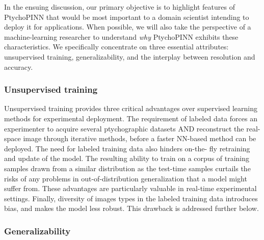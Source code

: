 \documentclass[sn-mathphys]{sn-jnl}%
\theoremstyle{thmstyleone}%
\theoremstyle{thmstyletwo}%
\theoremstyle{thmstylethree}%
\begin{document}
In the ensuing discussion, our primary objective is to highlight features of PtychoPINN  that would be most important to a domain scientist intending to deploy it for applications. When possible, we will also take the perspective of a machine-learning researcher to understand \emph{why} PtychoPINN exhibits these characteristics. We specifically concentrate on three essential attributes: unsupervised training, generalizability, and the interplay between resolution and accuracy.

\subsubsection{Unsupervised training} 
Unsupervised training provides three critical advantages over supervised learning methods for experimental deployment. The requirement of labeled data forces an experimenter to acquire several ptychographic datasets AND reconstruct the real-space image through iterative methods, before a faster NN-based method can be deployed.  The need for labeled training data also hinders on-the- fly retraining and update of the model. The resulting ability to train on a corpus of training samples drawn from a similar distribution as the test-time samples curtails the risks of any problems in out-of-distribution generalization that a model might suffer from. These advantages are particularly valuable in real-time experimental settings.  Finally, diversity of images types in the labeled training data introduces bias, and makes the model less robust.  This drawback is addressed further below.


\subsubsection{Generalizability} \label{sec_generalization}
\end{document}

